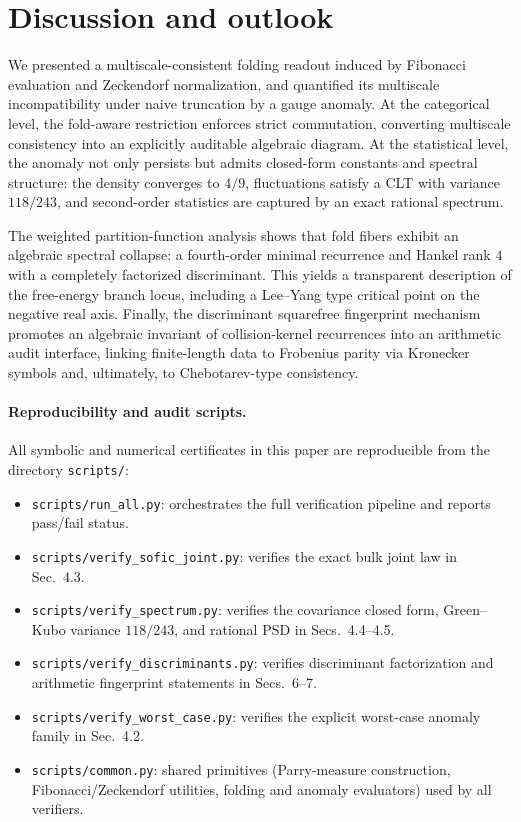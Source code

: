 \section{Discussion and outlook}
\label{sec:discussion}

We presented a multiscale-consistent folding readout induced by Fibonacci evaluation and Zeckendorf normalization, and quantified its multiscale incompatibility under naive truncation by a gauge anomaly. At the categorical level, the fold-aware restriction enforces strict commutation, converting multiscale consistency into an explicitly auditable algebraic diagram. At the statistical level, the anomaly not only persists but admits closed-form constants and spectral structure: the density converges to \(4/9\), fluctuations satisfy a CLT with variance \(118/243\), and second-order statistics are captured by an exact rational spectrum.

The weighted partition-function analysis shows that fold fibers exhibit an algebraic spectral collapse: a fourth-order minimal recurrence and Hankel rank \(4\) with a completely factorized discriminant. This yields a transparent description of the free-energy branch locus, including a Lee--Yang type critical point on the negative real axis. Finally, the discriminant squarefree fingerprint mechanism promotes an algebraic invariant of collision-kernel recurrences into an arithmetic audit interface, linking finite-length data to Frobenius parity via Kronecker symbols and, ultimately, to Chebotarev-type consistency.

\paragraph{Reproducibility and audit scripts.}
All symbolic and numerical certificates in this paper are reproducible from the directory \texttt{scripts/}:
\begin{itemize}[leftmargin=2.2em]
\item \texttt{scripts/run\_all.py}: orchestrates the full verification pipeline and reports pass/fail status.
\item \texttt{scripts/verify\_sofic\_joint.py}: verifies the exact bulk joint law in Sec.~4.3.
\item \texttt{scripts/verify\_spectrum.py}: verifies the covariance closed form, Green--Kubo variance \(118/243\), and rational PSD in Secs.~4.4--4.5.
\item \texttt{scripts/verify\_discriminants.py}: verifies discriminant factorization and arithmetic fingerprint statements in Secs.~6--7.
\item \texttt{scripts/verify\_worst\_case.py}: verifies the explicit worst-case anomaly family in Sec.~4.2.
\item \texttt{scripts/common.py}: shared primitives (Parry-measure construction, Fibonacci/Zeckendorf utilities, folding and anomaly evaluators) used by all verifiers.
\end{itemize}

